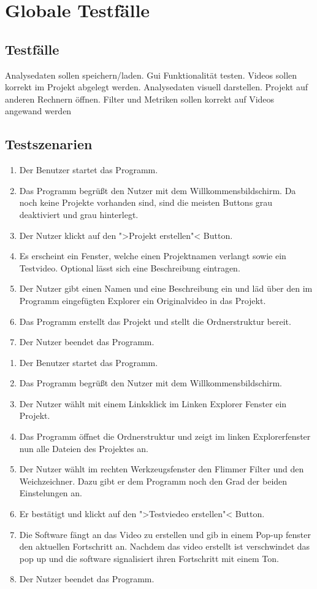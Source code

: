 \chapter{Globale Testfälle}
\section{Testfälle}
\setcounter{enumi}{0}
 Analysedaten sollen speichern/laden.
 Gui Funktionalität testen.
 Videos sollen korrekt im Projekt abgelegt werden.
 Analysedaten visuell darstellen.
 Projekt auf anderen Rechnern öffnen.
 Filter und Metriken sollen korrekt auf Videos angewand werden

\section{Testszenarien}
  \begin{enumerate}
\item Der Benutzer startet das Programm.
\item Das Programm begrüßt den Nutzer mit dem Willkommensbildschirm. Da noch keine Projekte vorhanden sind, sind die meisten Buttons grau deaktiviert und grau hinterlegt.
\item Der Nutzer klickt auf den ">Projekt erstellen"< Button.
\item Es erscheint ein Fenster, welche einen Projektnamen verlangt sowie ein Testvideo. Optional lässt sich eine Beschreibung eintragen.
\item Der Nutzer gibt einen Namen und eine Beschreibung ein und läd über den im Programm eingefügten Explorer ein Originalvideo in das Projekt.
\item Das Programm erstellt das Projekt und stellt die Ordnerstruktur bereit.
\item Der Nutzer beendet das Programm.

\end{enumerate}

  \begin{enumerate}
\item Der Benutzer startet das Programm.
\item Das Programm begrüßt den Nutzer mit dem Willkommensbildschirm.
\item Der Nutzer wählt mit einem Linksklick im Linken Explorer Fenster ein Projekt.
\item Das Programm öffnet die Ordnerstruktur und zeigt im linken Explorerfenster nun alle Dateien des Projektes an.
\item Der Nutzer wählt im rechten Werkzeugsfenster den Flimmer Filter und den Weichzeichner. Dazu gibt er dem Programm noch den Grad der beiden Einstelungen an.
\item Er bestätigt und klickt auf den ">Testviedeo erstellen"< Button.
\item Die Software fängt an das Video zu erstellen und gib in einem Pop-up fenster den aktuellen Fortschritt an. Nachdem das video erstellt ist verschwindet das pop up und die software signalisiert ihren Fortschritt mit einem Ton.
\item Der Nutzer beendet das Programm.
\end{enumerate}